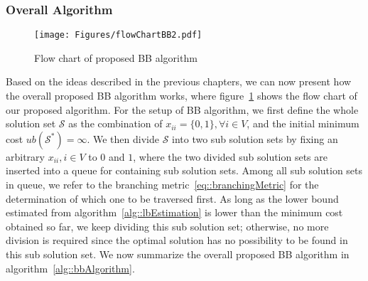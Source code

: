 \subsubsection{Overall Algorithm}
\begin{figure}
\begin{center}
\texttt{[image: Figures/flowChartBB2.pdf]}
\caption{\label{fig::flowChartBB}Flow chart of proposed BB algorithm}
\end{center}
\end{figure}
Based on the ideas described in the previous chapters, we can now present how the overall proposed BB algorithm works, where figure~\ref{fig::flowChartBB} shows the flow chart of our proposed algorithm.
For the setup of BB algorithm, we first define the whole solution set $\mathcal{S}$ as the combination of $x_{ii} = \{0,1\}, \forall i \in V$, and the initial minimum cost $ub(\mathcal{S}^*) = \infty$.
We then divide $\mathcal{S}$ into two sub solution sets by fixing an arbitrary $x_{ii}, i \in V$ to $0$ and $1$, where the two divided sub solution sets are inserted into a queue for containing sub solution sets.
Among all sub solution sets in queue, we refer to the branching metric~\eqref{eq::branchingMetric} for the determination of which one to be traversed first.
As long as the lower bound estimated from algorithm~\ref{alg::lbEstimation} is lower than the minimum cost obtained so far, we keep dividing this sub solution set; otherwise, no more division is required since the optimal solution has no possibility to be found in this sub solution set.
We now summarize the overall proposed BB algorithm in algorithm~\ref{alg::bbAlgorithm}.
\IncMargin{1em}

